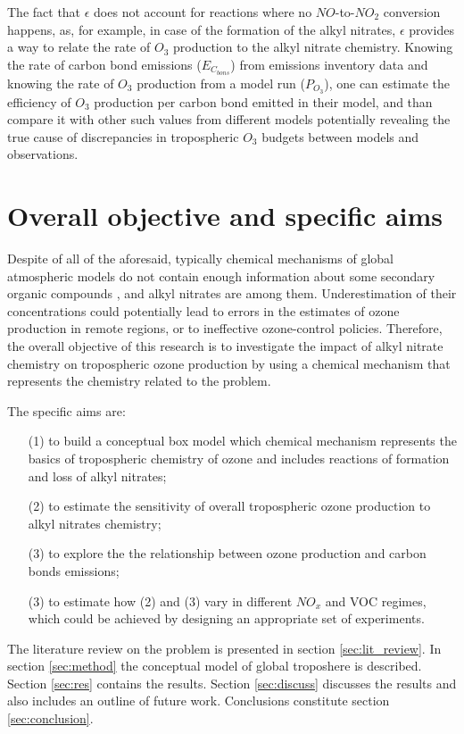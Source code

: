 \documentclass[11pt,a4paper]{article}
\begin{document}
The fact that $\epsilon$ does not account for reactions where no $NO$-to-$NO_2$ conversion happens, as, for example, in case of the formation of the alkyl nitrates, $\epsilon$ provides a way to relate the rate of $O_3$ production to the alkyl nitrate chemistry. Knowing the rate of carbon bond emissions ($E_{C_{bons}}$) from emissions inventory data and knowing the rate of $O_3$ production from a model run ($P_{O_3}$), one can estimate the efficiency of $O_3$ production per carbon bond emitted in their model, and than compare it with other such values from different models potentially revealing the true cause of discrepancies in tropospheric $O_3$ budgets between models and observations.

\section{Overall objective and specific aims}\label{sec:objams}
Despite of all of the aforesaid, typically chemical mechanisms of global atmospheric models do not contain enough information about some secondary organic compounds \citep{Sommariva2008}, and alkyl nitrates are among them. Underestimation of their concentrations could potentially lead to errors in the estimates of ozone production in remote regions, or to ineffective ozone-control policies. Therefore, the overall objective of this research is to investigate the impact of alkyl nitrate chemistry on tropospheric ozone production by using a chemical mechanism that represents the chemistry related to the problem.

The specific aims are:
\begin{itemize}
\item[(1)] to build a conceptual box model which chemical mechanism represents the basics of tropospheric chemistry of ozone and includes reactions of formation and loss of alkyl nitrates;
\item[(2)] to estimate the sensitivity of overall tropospheric ozone production to alkyl nitrates chemistry;
\item[(3)] to explore the the relationship between ozone production and carbon bonds emissions;
\item[(3)] to estimate how (2) and (3) vary in different $NO_x$ and VOC regimes, which could be achieved by designing an appropriate set of experiments.
\end{itemize}

The literature review on the problem is presented in section \ref{sec:lit_review}. In section \ref{sec:method} the conceptual model of global troposhere is described. Section \ref{sec:res} contains the results. Section \ref{sec:discuss} discusses the results and also includes an outline of future work. Conclusions constitute section \ref{sec:conclusion}.
\end{document}
